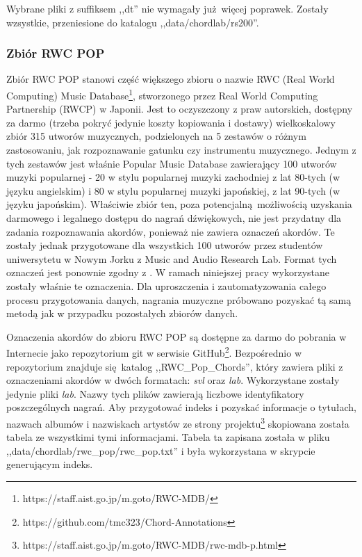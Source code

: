 Wybrane pliki z suffiksem ,,dt'' nie wymagały już więcej poprawek. Zostały wzsystkie, przeniesione
do katalogu ,,data/chordlab/rs200''.

\subsubsection{Zbiór RWC POP}

Zbiór RWC POP \cite{goto_rwc_nodate} stanowi część większego zbioru o nazwie RWC (Real World
Computing) Music Database\footnote{https://staff.aist.go.jp/m.goto/RWC-MDB/}, stworzonego przez Real
World Computing Partnership (RWCP) w Japonii. Jest to oczyszczony z praw autorskich, dostępny za
darmo (trzeba pokryć jedynie koszty kopiowania i dostawy) wielkoskalowy zbiór 315 utworów
muzycznych, podzielonych na 5 zestawów o różnym zastosowaniu, jak rozpoznawanie gatunku czy
instrumentu muzycznego. Jednym z tych zestawów jest właśnie Popular Music Database zawierający 100
utworów muzyki popularnej - 20 w stylu popularnej muzyki zachodniej z lat 80-tych (w języku
angielskim) i 80 w stylu popularnej muzyki japońskiej, z lat 90-tych (w języku japońskim). Właściwie
zbiór ten, poza potencjalną możliwością uzyskania darmowego i legalnego dostępu do nagrań
dźwiękowych, nie jest przydatny dla zadania rozpoznawania akordów, ponieważ nie zawiera oznaczeń
akordów. Te zostały jednak przygotowane dla wszystkich 100 utworów przez studentów uniwersytetu w
Nowym Jorku z Music and Audio Research Lab. Format tych oznaczeń jest ponownie zgodny z
\cite{harte_towards_nodate}. W ramach niniejszej pracy wykorzystane zostały właśnie te oznaczenia.
Dla uproszczenia i zautomatyzowania całego procesu przygotowania danych, nagrania muzyczne próbowano
pozyskać tą samą metodą jak w przypadku pozostałych zbiorów danych.

Oznaczenia akordów do zbioru RWC POP są dostępne za darmo do pobrania w Internecie jako repozytorium
git w serwisie GitHub\footnote{https://github.com/tmc323/Chord-Annotations}. Bezpośrednio w
repozytorium znajduje się katalog ,,RWC\_Pop\_Chords'', który zawiera pliki z oznaczeniami akordów w
dwóch formatach: \emph{svl} oraz \emph{lab}. Wykorzystane zostały jedynie pliki \emph{lab}. Nazwy
tych plików zawierają liczbowe identyfikatory poszczególnych nagrań. Aby przygotować indeks i
pozyskać informacje o tytułach, nazwach albumów i nazwiskach artystów ze strony
projektu\footnote{https://staff.aist.go.jp/m.goto/RWC-MDB/rwc-mdb-p.html} skopiowana została tabela
ze wszystkimi tymi informacjami. Tabela ta zapisana została w pliku
,,data/chordlab/rwc\_pop/rwc\_pop.txt'' i była wykorzystana w skrypcie generującym indeks.

